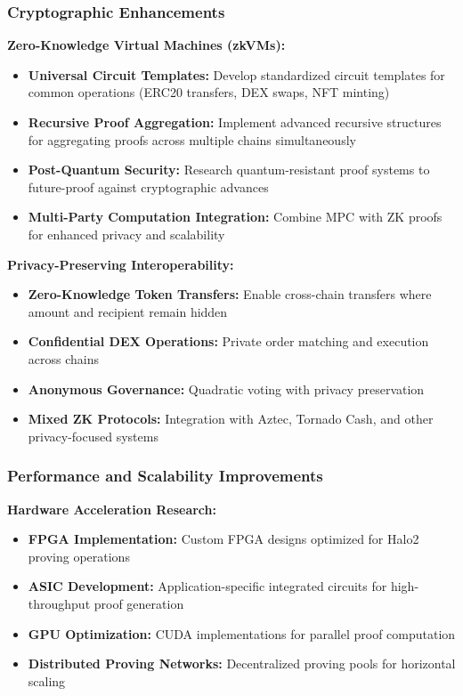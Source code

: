 \documentclass[11pt,a4paper]{article}
\begin{document}
\subsubsection{Cryptographic Enhancements}

\textbf{Zero-Knowledge Virtual Machines (zkVMs):}
\begin{itemize}
    \item \textbf{Universal Circuit Templates:} Develop standardized circuit templates for common operations (ERC20 transfers, DEX swaps, NFT minting)
    \item \textbf{Recursive Proof Aggregation:} Implement advanced recursive structures for aggregating proofs across multiple chains simultaneously
    \item \textbf{Post-Quantum Security:} Research quantum-resistant proof systems to future-proof against cryptographic advances
    \item \textbf{Multi-Party Computation Integration:} Combine MPC with ZK proofs for enhanced privacy and scalability
\end{itemize}

\textbf{Privacy-Preserving Interoperability:}
\begin{itemize}
    \item \textbf{Zero-Knowledge Token Transfers:} Enable cross-chain transfers where amount and recipient remain hidden
    \item \textbf{Confidential DEX Operations:} Private order matching and execution across chains
    \item \textbf{Anonymous Governance:} Quadratic voting with privacy preservation
    \item \textbf{Mixed ZK Protocols:} Integration with Aztec, Tornado Cash, and other privacy-focused systems
\end{itemize}

\subsubsection{Performance and Scalability Improvements}

\textbf{Hardware Acceleration Research:}
\begin{itemize}
    \item \textbf{FPGA Implementation:} Custom FPGA designs optimized for Halo2 proving operations
    \item \textbf{ASIC Development:} Application-specific integrated circuits for high-throughput proof generation
    \item \textbf{GPU Optimization:} CUDA implementations for parallel proof computation
    \item \textbf{Distributed Proving Networks:} Decentralized proving pools for horizontal scaling
\end{itemize}
\end{document}
